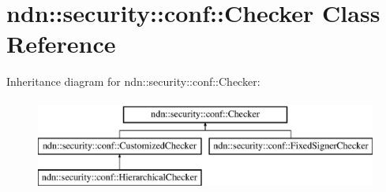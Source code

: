 \hypertarget{classndn_1_1security_1_1conf_1_1Checker}{}\section{ndn\+:\+:security\+:\+:conf\+:\+:Checker Class Reference}
\label{classndn_1_1security_1_1conf_1_1Checker}
Inheritance diagram for ndn\+:\+:security\+:\+:conf\+:\+:Checker\+:\begin{figure}[H]
\begin{center}
\leavevmode
\includegraphics[height=3.000000cm]{classndn_1_1security_1_1conf_1_1Checker}
\end{center}
\end{figure}
